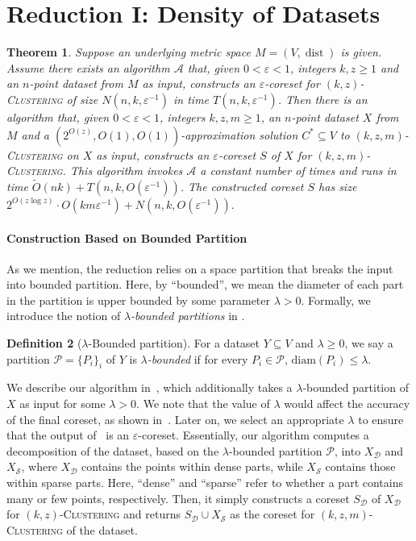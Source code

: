 \documentclass[letterpaper,11pt]{article}
\theoremstyle{plain}
\newtheorem{theorem}{Theorem}[section]
\theoremstyle{definition}
\newtheorem{definition}[theorem]{Definition}
\theoremstyle{remark}
\DeclareMathOperator{\dist}{dist}
\newcommand{\diam}{\mathrm{diam}}
\newcommand{\eps}{\varepsilon}
\newcommand{\calA}{\mathcal{A}}
\newcommand{\calD}{\mathcal{D}}
\newcommand{\calP}{\mathcal{P}}
\newcommand{\calS}{\mathcal{S}}
\newcommand{\ProblemName}[1]{\textsc{#1}}
\newcommand{\kzC}{\ProblemName{$(k,z)$-Clustering}\xspace}
\newcommand{\kzmC}{\ProblemName{$(k,z,m)$-Clustering}\xspace}
\begin{document}
\section{Reduction I: Density of Datasets}
\label{sec:Reduction-I}



\begin{theorem}
    \label{thm:reduction I}
    Suppose an underlying metric space $M=(V,\dist)$ is given.
    Assume there exists an algorithm $\calA$ that, given $0<\eps<1$, integers $k,z\ge 1$ and an $n$-point dataset from $M$ as input, constructs an $\eps$-coreset for \kzC of size $N(n,k,\eps^{-1})$ in time $T(n,k,\eps^{-1})$.
    Then there is an algorithm that, given $0<\eps<1$, integers $k,z,m\ge 1$, an $n$-point dataset $X$ from $M$ and a $(2^{O(z)},O(1),O(1))$-approximation solution $C^*\subseteq V$ to \kzmC on $X$ as input, constructs an $\eps$-coreset $S$ of $X$ for \kzmC.
    This algorithm invokes $\calA$ a constant number of times and runs in time $\tilde O(nk) + T(n,k,O(\eps^{-1}))$. The constructed coreset $S$ has size 
    $
        2^{O(z\log z)}\cdot O\left(km\eps^{-1}\right) +  N\left(n,k,O(\eps^{-1})\right).
    $
\end{theorem}



\paragraph{Construction Based on Bounded Partition}
As we mention, the reduction relies on a space partition that breaks the input into bounded partition. Here, by ``bounded'', we mean the diameter of each part in the partition is upper bounded by some parameter $\lambda > 0$. 
Formally, we introduce the notion of \emph{$\lambda$-bounded partitions} in . 
\begin{definition}[$\lambda$-Bounded partition]
    \label{def:bounded partition}
For a dataset $Y \subseteq V$ and  $\lambda\ge 0$, we say a partition $\calP = \{P_i \}_i$ of $Y$ is \emph{$\lambda$-bounded} if for every $P_i \in \calP$, $\diam(P_i)\le \lambda$.
\end{definition}



We describe our algorithm in~, which additionally takes a $\lambda$-bounded partition of $X$ as input for some $\lambda > 0$. We note that the value of $\lambda$ would affect the accuracy of the final coreset, as shown in~. Later on, we select an appropriate $\lambda$ to ensure that the output of~ is an $\eps$-coreset.
Essentially, our algorithm computes a decomposition of the dataset, based on the $\lambda$-bounded partition $\calP$, into $X_{\calD}$ and $X_{\calS}$, where $X_{\calD}$ contains the points within dense parts, while $X_\calS$ contains those within sparse parts.
Here, ``dense'' and ``sparse'' refer to whether a part contains many or few points, respectively.
Then, it simply constructs a coreset $S_{\calD}$ of $X_{\calD}$ for \kzC and returns $S_{\calD} \cup X_{\calS}$ as the coreset for \kzmC of the dataset.
\end{document}
